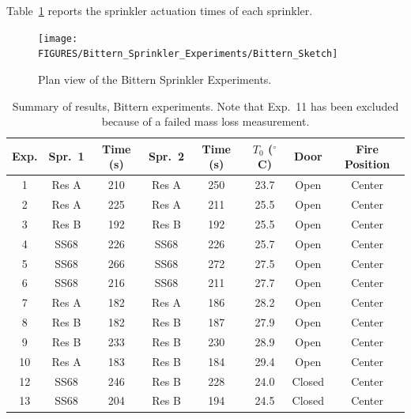 Table~\ref{bit_sum} reports the sprinkler actuation times of each sprinkler.

\begin{figure}[h]
\centering
\texttt{[image: FIGURES/Bittern\_Sprinkler\_Experiments/Bittern\_Sketch]}
\caption[Plan view of the Bittern Sprinkler Experiments]{Plan view of the Bittern Sprinkler Experiments.}
\label{bit_plan}
\end{figure}


\begin{table}[!ht]
\centering
\caption[Summary of results, Bittern experiments]{Summary of results, Bittern experiments. Note that Exp.~11 has been excluded because of a failed mass loss measurement.}
\label{bit_sum}
\begin{tabular}{|c|c|c|c|c|c|c|c|}
\hline
Exp. & Spr.~1 & Time (s) & Spr.~2 & Time (s) & $T_0$ ($^\circ$C) & Door   & Fire Position \\ \hline \hline
1    & Res A  & 210      & Res A  & 250      & 23.7              & Open   & Center        \\ \hline
2    & Res A  & 225      & Res A  & 211      & 25.5              & Open   & Center        \\ \hline
3    & Res B  & 192      & Res B  & 192      & 25.5              & Open   & Center        \\ \hline
4    & SS68   & 226      & SS68   & 226      & 25.7              & Open   & Center        \\ \hline
5    & SS68   & 266      & SS68   & 272      & 27.5              & Open   & Center        \\ \hline
6    & SS68   & 216      & SS68   & 211      & 27.7              & Open   & Center        \\ \hline
7    & Res A  & 182      & Res A  & 186      & 28.2              & Open   & Center        \\ \hline
8    & Res B  & 182      & Res B  & 187      & 27.9              & Open   & Center        \\ \hline
9    & Res B  & 233      & Res B  & 230      & 28.9              & Open   & Center        \\ \hline
10   & Res A  & 183      & Res B  & 184      & 29.4              & Open   & Center        \\ \hline
12   & SS68   & 246      & Res B  & 228      & 24.0              & Closed & Center        \\ \hline
13   & SS68   & 204      & Res B  & 194      & 24.5              & Closed & Center        \\ \hline

\end{tabular}
\end{table}
